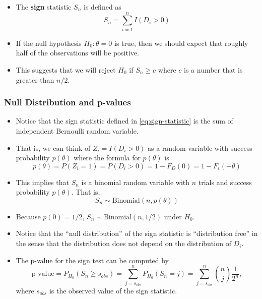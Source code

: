 \documentclass[]{book}
\begin{document}
\begin{itemize}
\item
  The \textbf{sign} statistic \(S_{n}\) is defined as
  \begin{equation}
  S_{n} = \sum_{i=1}^{n} I( D_{i} > 0)
  \label{eq:sign-statistic}
  \end{equation}
\item
  If the null hypothesis \(H_{0}: \theta = 0\) is true, then we should expect that roughly half
  of the observations will be positive.
\item
  This suggests that we will reject \(H_{0}\) if \(S_{n} \geq c\) where \(c\) is a
  number that is greater than \(n/2\).
\end{itemize}

\hypertarget{null-distribution-and-p-values}{%
\subsubsection{Null Distribution and p-values}\label{null-distribution-and-p-values}}

\begin{itemize}
\item
  Notice that the sign statistic defined in \eqref{eq:sign-statistic} is the sum of independent
  Bernoulli random variable.
\item
  That is, we can think of \(Z_{i} = I(D_{i} > 0)\) as a random variable with success probability
  \(p( \theta )\) where the formula for \(p( \theta )\) is
  \begin{equation}
  p(\theta) = P(Z_{i} = 1) = P(D_{i} > 0) = 1 - F_{D}(0) = 1 - F_{\epsilon}( -\theta )
  \end{equation}
\item
  This implies that \(S_{n}\) is a binomial random variable
  with \(n\) trials and success probability \(p(\theta)\).
  That is,
  \begin{equation}
  S_{n} \sim \textrm{Binomial}(n, p(\theta) )
  \label{eq:signstat-distribution}
  \end{equation}
\item
  Because \(p(0) = 1/2\), \(S_{n} \sim \textrm{Binomial}(n, 1/2 )\) under \(H_{0}\).
\item
  Notice that the ``null distribution'' of the sign statistic is ``distribution free''
  in the sense that the distribution does not depend on the distribution of \(D_{i}\).
\item
  The p-value for the sign test can be computed by
  \begin{equation}
  \textrm{p-value} = P_{H_{0}}(S_{n} \geq s_{obs}) = \sum_{j=s_{obs}}^{n} P_{H_{0}}(S_{n} = j)
  = \sum_{j=s_{obs}}^{n} {n \choose j} \frac{1}{2^{n}},
  \end{equation}
  where \(s_{obs}\) is the observed value of the sign statistic.
\end{itemize}
\end{document}
